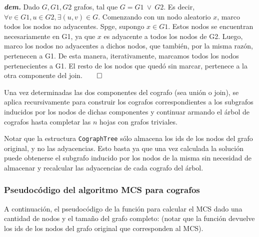\emph{\textbf{dem.}} Dado $G, G1, G2$ grafos, tal que $G = G1\ \lor\ G2$. Es decir, $\forall v \in G1, u \in G2, \exists (u, v) \in G$. Comenzando con un nodo aleatorio $x$, marco todos los nodos no adyacentes. Spge, supongo $x \in G1$. Estos nodos se encuentran necesariamente en G1, ya que $x$ es adyacente a todos los nodos de G2. Luego, marco los nodos no adyacentes a dichos nodos, que también, por la misma razón, pertenecen a G1. De esta manera, iterativamente, marcamos todos los nodos pertenecientes a G1. El resto de los nodos que quedó sin marcar, pertenece a la otra componente del join.$\qed$

Una vez determinadas las dos componentes del cografo (sea unión o join), se aplica recursivamente para construir los cografos correspondientes a los subgrafos inducidos por los nodos de dichas componentes y continuar armando el árbol de cografos hasta completar las $n$ hojas con grafos triviales.

Notar que la estructura \texttt{CographTree} sólo almacena los ids de los nodos del grafo original, y no las adyacencias. Esto basta ya que una vez calculada la solución puede obtenerse el subgrafo inducido por los nodos de la misma sin necesidad de almacenar y recalcular las adyacencias de cada cografo del árbol.

\subsubsection{Pseudocódigo del algoritmo MCS para cografos}

A continuación, el pseudocódigo de la función para calcular el MCS dado una cantidad de nodos y el tamaño del grafo completo: (notar que la función devuelve los ids de los nodos del grafo original que corresponden al MCS).

